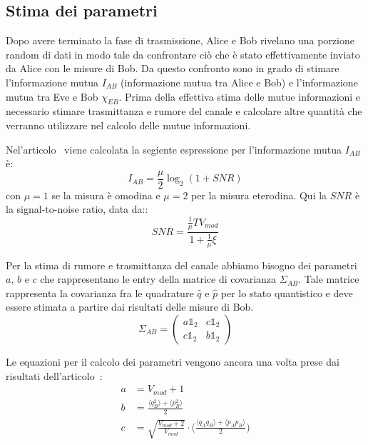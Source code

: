 \subsection{Stima dei parametri}\label{subse:stima-parametri}
Dopo avere terminato la fase di trasmissione, Alice e Bob rivelano una porzione random di dati in modo tale da confrontare ci\`o che \`e stato effettivamente inviato da Alice con le misure di Bob. Da questo confronto sono in grado di stimare l'informazione mutua $I_{AB}$ (informazione mutua tra Alice e Bob) e l'informazione mutua tra Eve e Bob $\chi_{EB}$. Prima della effettiva stima delle mutue informazioni e necessario stimare trasmittanza e rumore del canale e calcolare altre quantit\`a che verranno utilizzare nel calcolo delle mutue informazioni.

Nel'articolo~\cite{https://doi.org/10.1002/qute.201800011} viene calcolata la segiente espressione per l'informazione mutua $I_{AB}$ \`e:
\begin{equation} \label{eq:AB-info}
I_{AB} = \frac{\mu}{2}\log_2(1 + SNR)
\end{equation}
con $\mu = 1$ se la misura \`e omodina e $\mu = 2$ per la misura eterodina. Qui la $SNR$ è la signal-to-noise ratio, data da::
\begin{equation} \label{eq:snr}
SNR = \frac{\frac{1}{\mu} T V_{mod}}{1 + \frac{1}{\mu} \xi}
\end{equation}

Per la stima di rumore e trasmittanza del canale abbiamo bisogno dei parametri $a$, $b$ e $c$ che rappresentano le entry della matrice di covarianza $\Sigma_{AB}$. Tale matrice rappresenta la covarianza fra le quadrature $\hat q$ e $\hat p$ per lo stato quantistico e deve essere stimata a partire dai risultati delle misure di Bob.
\begin{equation}
\Sigma_{AB} =
\begin{pmatrix}
a \mathbb{1}_2 & c \mathbb{1}_2 \\
c \mathbb{1}_2 & b \mathbb{1}_2
\end{pmatrix}
\end{equation}

Le equazioni per il calcolo dei parametri vengono ancora una volta prese dai risultati dell'articolo~\cite{https://doi.org/10.1002/qute.201800011}:
\begin{equation}
\begin{split}
a& = V_{mod} + 1 \\
b& = \frac{\langle q_B^2 \rangle + \langle p_B^2 \rangle}{2} \\
c& = \sqrt{\frac{V_{mod} + 2}{V_{mod}}} \cdot \biggl ( \frac{\langle q_Aq_B \rangle + \langle p_Ap_B \rangle}{2}\biggr )
\end{split}
\end{equation}

